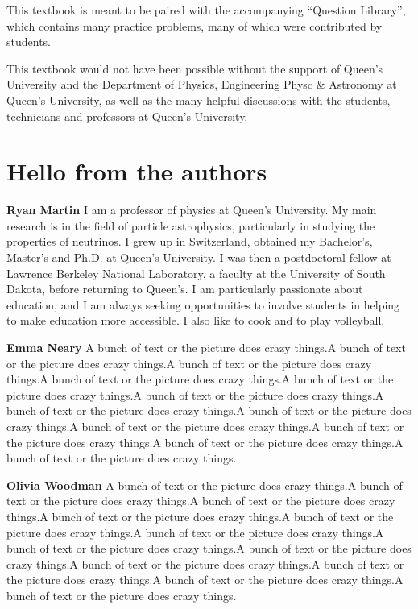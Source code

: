 This textbook is meant to be paired with the accompanying ``Question Library'', which contains many practice problems, many of which were contributed by students. 

This textbook would not have been possible without the support of Queen's University and the Department of Physics, Engineering Physc \& Astronomy at Queen's University, as well as the many helpful discussions with the students, technicians and professors at Queen's University.

\section*{Hello from the authors}
\textbf{Ryan Martin} I am a professor of physics at Queen's University. My main research is in the field of particle astrophysics, particularly in studying the properties of neutrinos. I grew up in Switzerland, obtained my Bachelor's, Master's and Ph.D. at Queen's University. I was then a postdoctoral fellow at Lawrence Berkeley National Laboratory, a faculty at the University of South Dakota, before returning to Queen's. I am particularly passionate about education, and I am always seeking opportunities to involve students in helping to make education more accessible. I also like to cook and to play volleyball.

\textbf{Emma Neary} A bunch of text or the picture does crazy things.A bunch of text or the picture does crazy things.A bunch of text or the picture does crazy things.A bunch of text or the picture does crazy things.A bunch of text or the picture does crazy things.A bunch of text or the picture does crazy things.A bunch of text or the picture does crazy things.A bunch of text or the picture does crazy things.A bunch of text or the picture does crazy things.A bunch of text or the picture does crazy things.A bunch of text or the picture does crazy things.A bunch of text or the picture does crazy things.

\textbf{Olivia Woodman} A bunch of text or the picture does crazy things.A bunch of text or the picture does crazy things.A bunch of text or the picture does crazy things.A bunch of text or the picture does crazy things.A bunch of text or the picture does crazy things.A bunch of text or the picture does crazy things.A bunch of text or the picture does crazy things.A bunch of text or the picture does crazy things.A bunch of text or the picture does crazy things.A bunch of text or the picture does crazy things.A bunch of text or the picture does crazy things.A bunch of text or the picture does crazy things.

